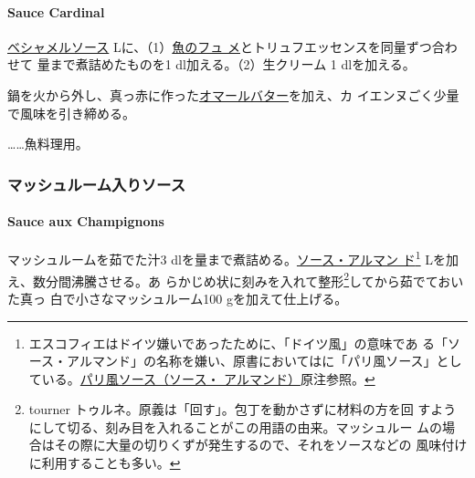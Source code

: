 \begin{recette}
{\paragraph{Sauce Cardinal}\label{sauce-cardinal}}


\protect\hyperlink{sauce-bechamel}{ベシャメルソース}\troisquarts{}
Lに、（1）\protect\hyperlink{fumet-de-poisson}{魚のフュ
メ}とトリュフエッセンスを同量ずつ合わせて
\troisquarts{}量まで煮詰めたものを1\undemi{} dl加える。（2）生クリーム
1\undemi{} dlを加える。

鍋を火から外し、真っ赤に作った\protect\hyperlink{beurre-de-homard}{オマールバター}を加え、カ
イエンヌごく少量で風味を引き締める。

\ldots{}\ldots{}魚料理用。

\maeaki

\hypertarget{ux30deux30c3ux30b7ux30e5ux30ebux30fcux30e0ux5165ux308aux30bdux30fcux30b9}{%
\subsubsection{マッシュルーム入りソース}\label{ux30deux30c3ux30b7ux30e5ux30ebux30fcux30e0ux5165ux308aux30bdux30fcux30b9}}

\hypertarget{sauce-aux-champignons-blanche}{%
\paragraph{Sauce aux Champignons}\label{sauce-aux-champignons-blanche}}


マッシュルームを茹でた汁3
dlを\untiers{}量まで煮詰める。\protect\hyperlink{sauce-allemande}{ソース・アルマン
ド}\footnote{エスコフィエはドイツ嫌いであったために、「ドイツ風」の意味であ
  る「ソース・アルマンド」の名称を嫌い、原書においてはに「パリ風ソース」としている。\protect\hyperlink{sauce-allemande}{パリ風ソース（ソース・
  アルマンド）}原注参照。}\troisquarts{} Lを加え、数分間沸騰させる。あ
らかじめ状に刻みを入れて整形\footnote{tourner
  トゥルネ。原義は「回す」。包丁を動かさずに材料の方を回
  すようにして切る、刻み目を入れることがこの用語の由来。マッシュルー
  ムの場合はその際に大量の切りくずが発生するので、それをソースなどの
  風味付けに利用することも多い。}してから茹でておいた真っ
白で小さなマッシュルーム100 gを加えて仕上げる。


\end{recette}
